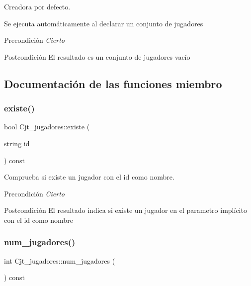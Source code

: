 Creadora por defecto. 

Se ejecuta automáticamente al declarar un conjunto de jugadores \begin{DoxyPrecond}{Precondición}
{\itshape Cierto} 
\end{DoxyPrecond}
\begin{DoxyPostcond}{Postcondición}
El resultado es un conjunto de jugadores vacío 
\end{DoxyPostcond}


\subsection{Documentación de las funciones miembro}
\mbox{\label{class_cjt__jugadores_a90a090845d242dd1f7dddf2d19467592}} 
\subsubsection{\texorpdfstring{existe()}{existe()}}
{\footnotesize\ttfamily bool Cjt\+\_\+jugadores\+::existe (\begin{DoxyParamCaption}\item[{string}]{id }\end{DoxyParamCaption}) const}



Comprueba si existe un jugador con el id como nombre. 

\begin{DoxyPrecond}{Precondición}
{\itshape Cierto} 
\end{DoxyPrecond}
\begin{DoxyPostcond}{Postcondición}
El resultado indica si existe un jugador en el parametro implícito con el id como nombre 
\end{DoxyPostcond}
\mbox{\label{class_cjt__jugadores_a4951d7691e67c44415fdcb3119dd4148}} 
\subsubsection{\texorpdfstring{num\+\_\+jugadores()}{num\_jugadores()}}
{\footnotesize\ttfamily int Cjt\+\_\+jugadores\+::num\+\_\+jugadores (\begin{DoxyParamCaption}{ }\end{DoxyParamCaption}) const}



